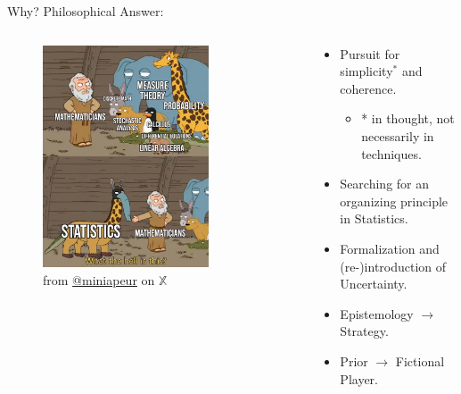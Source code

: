 \documentclass{beamer}
\theoremstyle{definition}
\begin{document}
\begin{frame}{Why? Philosophical Answer:}

\begin{columns}

\begin{column}{0.5\textwidth}
    \begin{figure}
    \centering
        \includegraphics[width=0.75\textwidth]{img/StatisticsMeme.jpeg}
        \caption{\small from \href{https://twitter.com/miniapeur/status/1673275056812597248/photo/1}{@miniapeur} on $\mathbb{X}$}
    \end{figure}
\end{column}

        \begin{column}{0.5\textwidth}
            \begin{itemize}
    \item Pursuit for simplicity$^*$ and coherence.
    \begin{itemize}
        \item * in thought, not necessarily in techniques.
    \end{itemize}
    \item Searching for an organizing principle in Statistics.
    \item Formalization and (re-)introduction of Uncertainty.
    \item Epistemology $\to$ Strategy.
    \item Prior $\to$ Fictional Player.
\end{itemize}
        \end{column}

\end{columns}

\end{frame}
\end{document}
